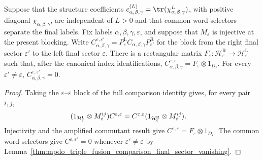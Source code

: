 \begin{lemma}%
    \label{thm:mpdo_triple_fusion_comparison_final_sector_kronecker}
    \leanok
    Suppose that the structure coefficients
    $c_{\alpha,\beta,\gamma}^{(L)}
        =\tr(\chi_{\alpha,\beta,\gamma}^{L})$,
    with positive diagonal $\chi_{\alpha,\beta,\gamma}$, are independent of
    $L>0$ and that common word selectors separate the final labels.
    Fix labels $\alpha,\beta,\gamma,\varepsilon$, and suppose that
    $M_\varepsilon$ is injective at the present blocking. Write
    $C^{\varepsilon,\varepsilon'}_{\alpha,\beta,\gamma}
        =P^{\mathrm L}_{\varepsilon}
        C_{\alpha,\beta,\gamma}
        P^{\mathrm R}_{\varepsilon'}$
    for the block from the right final sector $\varepsilon'$ to the left
    final sector $\varepsilon$. There is a rectangular matrix
    $F_\varepsilon:\mathcal H^{\mathrm R}_{\varepsilon}
        \to\mathcal H^{\mathrm L}_{\varepsilon}$ such that, after the canonical
    index identifications,
    $C^{\varepsilon,\varepsilon}_{\alpha,\beta,\gamma}
        =F_\varepsilon\otimes 1_{D_\varepsilon}$.
    For every $\varepsilon'\ne\varepsilon$,
    $C^{\varepsilon,\varepsilon'}_{\alpha,\beta,\gamma}=0$.
\end{lemma}
\begin{proof}\leanok
    Taking the $\varepsilon$--$\varepsilon$ block of the full comparison
    identity gives, for every pair $i,j$,
    \begin{align}
        (1_{\mathcal H^{\mathrm L}_\varepsilon}\otimes
        M_\varepsilon^{ij})C^{\varepsilon,\varepsilon}
         & =C^{\varepsilon,\varepsilon}
        (1_{\mathcal H^{\mathrm R}_\varepsilon}\otimes
        M_\varepsilon^{ij}).
        \notag
    \end{align}
    Injectivity and the amplified commutant result give
    $C^{\varepsilon,\varepsilon}=F_\varepsilon\otimes1_{D_\varepsilon}$.
    The common word selectors give
    $C^{\varepsilon,\varepsilon'}=0$ whenever
    $\varepsilon'\ne\varepsilon$ by
    Lemma~\ref{thm:mpdo_triple_fusion_comparison_final_sector_vanishing}.
\end{proof}

